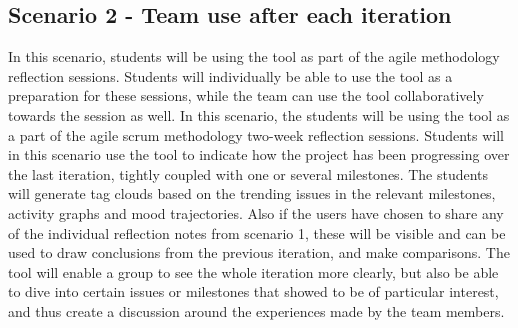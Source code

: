 \subsection{Scenario 2 - Team use after each iteration}
\label{scenario2}
In this scenario, students will be using the tool as part of the agile methodology reflection sessions. Students will individually be able to use the tool as a preparation for these sessions, while the team can use the tool collaboratively towards the session as well.
In this scenario, the students will be using the tool as a part of the agile scrum methodology two-week reflection sessions. Students will in this scenario use the tool to indicate how the project has been progressing over the last iteration, tightly coupled with one or several milestones. The students will generate tag clouds based on the trending issues in the relevant milestones, activity graphs and mood trajectories. Also if the users have chosen to share any of the individual reflection notes from scenario 1, these will be visible and can be used to draw conclusions from the previous iteration, and make comparisons. The tool will enable a group to see the whole iteration more clearly, but also be able to dive into certain issues or milestones that showed to be of particular interest, and thus create a discussion around the experiences made by the team members.  
